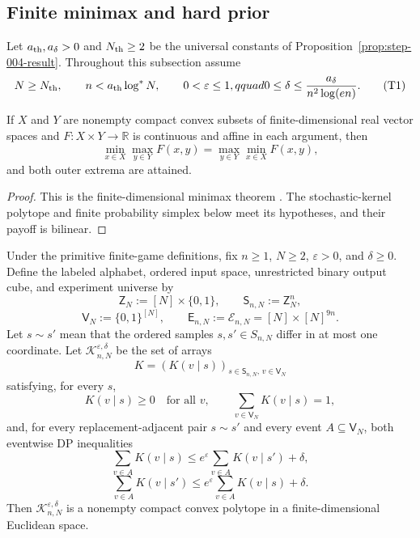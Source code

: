 \subsection{Finite minimax and hard prior}
\label{app:step-005}

Let $a_{\rm th},a_\delta>0$ and $N_{\rm th}\geq2$ be the universal
constants of Proposition~\ref{prop:step-004-result}.  Throughout this
subsection assume
\[
N\geq N_{\rm th},\qquad
n<a_{\rm th}\log^*N,
\qquad 0<\varepsilon\leq1,qquad
0\leq\delta\leq\frac{a_\delta}{n^2\log(en)}.
\tag{T1}\label{eq:step-005-t1}
\]

\begin{theorem}
\label{thm:finite-minimax}
If $X$ and $Y$ are nonempty compact convex subsets of finite-dimensional
real vector spaces and $F:X\times Y\to\mathbb R$ is continuous and affine
in each argument, then
\[
\min_{x\in X}\max_{y\in Y}F(x,y)
=\max_{y\in Y}\min_{x\in X}F(x,y),
\tag{C2}\label{eq:step-005-c2}
\]
and both outer extrema are attained.
\end{theorem}
\begin{proof}
This is the finite-dimensional minimax theorem
\citep{vonNeumann1928}.  The stochastic-kernel polytope and finite
probability simplex below meet its hypotheses, and their payoff is
bilinear.
\end{proof}



\begin{proposition}
\label{prop:step-005-dp-polytope}

Under the primitive finite-game definitions, fix \(n\ge 1\), \(N\ge 2\), \(\varepsilon>0\), and \(\delta\ge 0\). Define the labeled alphabet, ordered input space, unrestricted binary output cube, and experiment universe by
\[
\mathsf Z_N:=[N]\times\{0,1\},
\qquad
\mathsf S_{n,N}:=\mathsf Z_N^n,
\tag{1}\label{eq:step-005-1}
\]
\[
\mathsf V_N:=\{0,1\}^{[N]},
\qquad
\mathsf E_{n,N}:=\mathcal E_{n,N}=[N]\times[N]^{9n}.
\tag{2}\label{eq:step-005-2}
\]
Let \(s \sim s'\) mean that the ordered samples \(s,s' \in S_{n,N}\) differ in at most one coordinate. Let
\(\mathcal K_{n,N}^{\varepsilon,\delta}\) be the set of arrays
\[
K=(K(v\mid s))_{s\in\mathsf S_{n,N},\,v\in\mathsf V_N}
\tag{3}\label{eq:step-005-3}
\]
satisfying, for every \(s\),
\[
K(v\mid s)\ge0
\quad\text{for all }v,
\qquad
\sum_{v\in\mathsf V_N}K(v\mid s)=1,
\tag{4}\label{eq:step-005-4}
\]
and, for every replacement-adjacent pair \(s \sim s'\) and every event
\(A\subseteq\mathsf V_N\), both eventwise DP inequalities
\[
\sum_{v\in A}K(v\mid s)
\le
e^\varepsilon\sum_{v\in A}K(v\mid s')+\delta,
\tag{5a}\label{eq:step-005-5a}
\]
\[
\sum_{v\in A}K(v\mid s')
\le
e^\varepsilon\sum_{v\in A}K(v\mid s)+\delta.
\tag{5b}\label{eq:step-005-5b}
\]
Then \(\mathcal K_{n,N}^{\varepsilon,\delta}\) is a nonempty compact convex polytope in a finite-dimensional Euclidean space.

\end{proposition}

